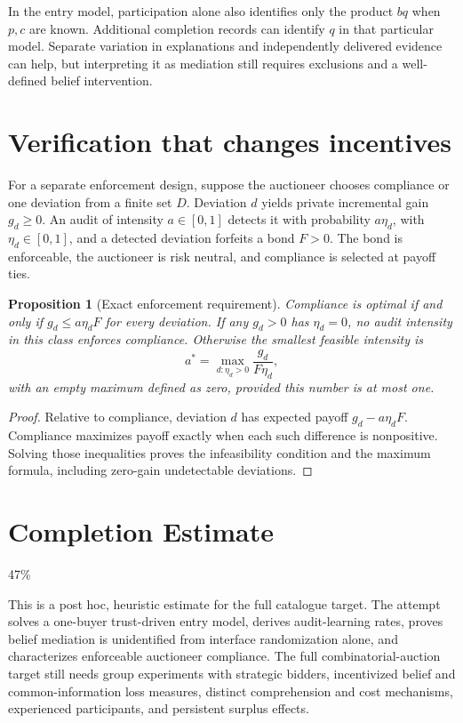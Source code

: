 \documentclass[11pt,a4paper]{article}
\newtheorem{proposition}[theorem]{Proposition}
\theoremstyle{definition}
\theoremstyle{remark}
\begin{document}
In the entry model, participation alone also identifies only the product $bq$ when $p,c$ are known. Additional completion records can identify $q$ in that particular model. Separate variation in explanations and independently delivered evidence can help, but interpreting it as mediation still requires exclusions and a well-defined belief intervention.

\section{Verification that changes incentives}
For a separate enforcement design, suppose the auctioneer chooses compliance or one deviation from a finite set $D$. Deviation $d$ yields private incremental gain $g_d\geq0$. An audit of intensity $a\in[0,1]$ detects it with probability $a\eta_d$, with $\eta_d\in[0,1]$, and a detected deviation forfeits a bond $F>0$. The bond is enforceable, the auctioneer is risk neutral, and compliance is selected at payoff ties.

\begin{proposition}[Exact enforcement requirement]
Compliance is optimal if and only if $g_d\leq a\eta_dF$ for every deviation. If any $g_d>0$ has $\eta_d=0$, no audit intensity in this class enforces compliance. Otherwise the smallest feasible intensity is
\[
 a^*=\max_{d:\eta_d>0}\frac{g_d}{F\eta_d},
\]
with an empty maximum defined as zero, provided this number is at most one.
\end{proposition}
\begin{proof}
Relative to compliance, deviation $d$ has expected payoff $g_d-a\eta_dF$. Compliance maximizes payoff exactly when each such difference is nonpositive. Solving those inequalities proves the infeasibility condition and the maximum formula, including zero-gain undetectable deviations.
\end{proof}

\section{Completion Estimate}
47\%

This is a post hoc, heuristic estimate for the full catalogue target.
The attempt solves a one-buyer trust-driven entry model, derives audit-learning rates, proves belief mediation is unidentified from interface randomization alone, and characterizes enforceable auctioneer compliance. The full combinatorial-auction target still needs group experiments with strategic bidders, incentivized belief and common-information loss measures, distinct comprehension and cost mechanisms, experienced participants, and persistent surplus effects.
\end{document}
